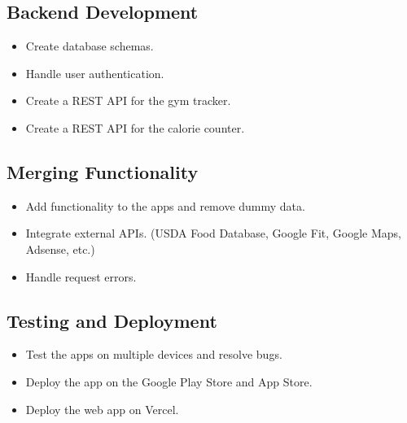 \subsection{Backend Development}
\begin{itemize}
    \item Create database schemas.
    \item Handle user authentication.
    \item Create a REST API for the gym tracker.
    \item Create a REST API for the calorie counter.
\end{itemize}

\subsection{Merging Functionality}
\begin{itemize}
    \item Add functionality to the apps and remove dummy data.
    \item Integrate external APIs. (USDA Food Database, Google Fit, Google Maps, Adsense, etc.)
    \item Handle request errors.
\end{itemize}

\subsection{Testing and Deployment}
\begin{itemize}
    \item Test the apps on multiple devices and resolve bugs.
    \item Deploy the app on the Google Play Store and App Store.
    \item Deploy the web app on Vercel.
\end{itemize}

\clearpage